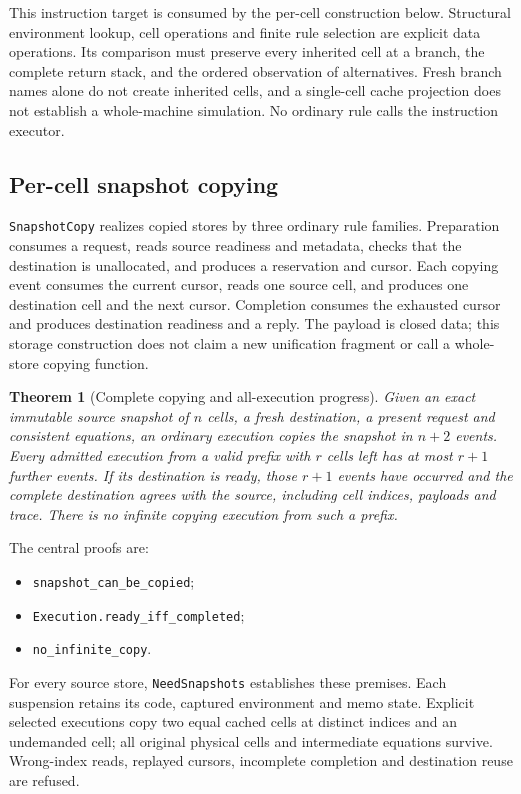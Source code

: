 \documentclass[11pt]{article}
\newtheorem{theorem}{Theorem}
\newcommand{\code}[1]{\texttt{\small #1}}
\begin{document}
This instruction target is consumed by the per-cell construction below.
Structural environment lookup, cell operations and finite rule selection
are explicit data operations. Its comparison must preserve every inherited
cell at a branch, the complete return stack, and the ordered observation of
alternatives. Fresh branch names alone do not create inherited cells, and
a single-cell cache projection does not establish a whole-machine
simulation. No ordinary rule calls the instruction executor.

\subsection{Per-cell snapshot copying}

\code{SnapshotCopy} realizes copied stores by three ordinary rule families.
Preparation consumes a request, reads source readiness and metadata, checks
that the destination is unallocated, and produces a reservation and cursor.
Each copying event consumes the current cursor, reads one source cell, and
produces one destination cell and the next cursor. Completion consumes the
exhausted cursor and produces destination readiness and a reply. The payload
is closed data; this storage construction does not claim a new unification
fragment or call a whole-store copying function.

\begin{theorem}[Complete copying and all-execution progress]
Given an exact immutable source snapshot of $n$ cells, a fresh destination,
a present request and consistent equations, an ordinary execution copies
the snapshot in $n+2$ events. Every admitted execution from a valid prefix
with $r$ cells left has at most $r+1$ further events. If its destination is
ready, those $r+1$ events have occurred and the complete destination agrees
with the source, including cell indices, payloads and trace. There is no
infinite copying execution from such a prefix.
\end{theorem}
The central proofs are:
\begin{itemize}
\item \code{snapshot\_can\_be\_copied};
\item \code{Execution.ready\_iff\_completed};
\item \code{no\_infinite\_copy}.
\end{itemize}
For every source store, \code{NeedSnapshots} establishes these premises.
Each suspension retains its code, captured environment and memo state.
Explicit selected executions copy two
equal cached cells at distinct indices and an undemanded cell; all original
physical cells and intermediate equations survive. Wrong-index reads,
replayed cursors, incomplete completion and destination reuse are refused.
\end{document}
